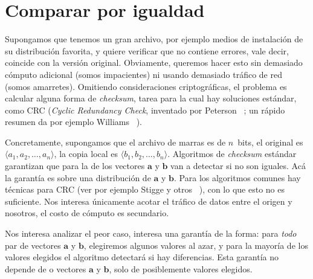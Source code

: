 \section{Comparar por igualdad}
\label{sec:comparar}

  Supongamos que tenemos un gran archivo,
  por ejemplo medios de instalación de su distribución favorita,
  y quiere verificar que no contiene errores,
  vale decir,
  coincide con la versión original.
  Obviamente,
  queremos hacer esto sin demasiado cómputo adicional
  (somos impacientes)
  ni usando demasiado tráfico de red
  (somos amarretes).
  Omitiendo consideraciones criptográficas,
  el problema es calcular alguna forma
  de \emph{\foreignlanguage{english}{checksum}},
  tarea para la cual hay soluciones estándar,
  como CRC
  (\emph{\foreignlanguage{english}{Cyclic Redundancy Check}},
   inventado por Peterson~%
     \cite{peterson61:_CRC};
   un rápido resumen da por ejemplo Williams~%
     \cite{williams96:_painless_guide_crc}).

  Concretamente,
  supongamos que el archivo de marras es de \(n\)~bits,
  el original es \(\langle a_1, a_2, \dotsc, a_n \rangle\),
  la copia local es \(\langle b_1, b_2, \dotsc, b_n \rangle\).
  Algoritmos de \emph{\foreignlanguage{english}{checksum}} estándar
  garantizan
  que para la  de los vectores \(\mathbf{a}\) y \(\mathbf{b}\)
  van a detectar si no son iguales.
  Acá la garantía
  es sobre una distribución de \(\mathbf{a}\) y \(\mathbf{b}\).
  Para los algoritmos comunes hay técnicas para  CRC
  (ver por ejemplo Stigge y otros~%
     \cite{stigge06:_reversing_crc}),
  con lo que esto no es suficiente.
  Nos interesa únicamente acotar el tráfico de datos
  entre el origen y nosotros,
  el costo de cómputo es secundario.

  Nos interesa analizar el peor caso,
  interesa una garantía de la forma:
  para \emph{todo} par de vectores \(\mathbf{a}\) y \(\mathbf{b}\),
  elegiremos algunos valores al azar,
  y para la mayoría de los valores elegidos el algoritmo
  detectará si hay diferencias.
  Esta garantía no depende de  o  vectores
  \(\mathbf{a}\) y \(\mathbf{b}\),
  solo de posiblemente  valores elegidos.

